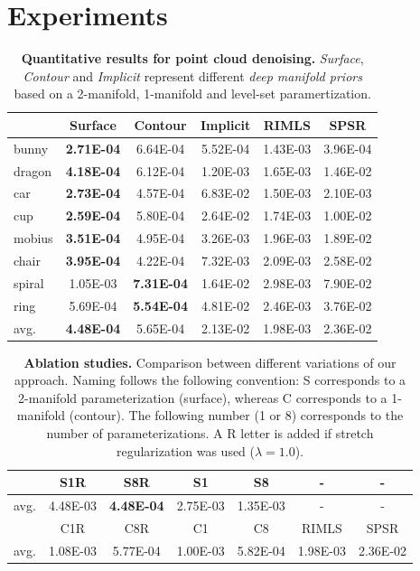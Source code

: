 \section{Experiments}\label{dmp:experiments}

\begin{table}[t]
\centering
\footnotesize
\tabcolsep=0.11cm
\begin{tabular}{|l|c|c|c||c|c|}
\hline
& Surface & Contour & Implicit & RIMLS\cite{rimls} & SPSR\cite{spsr} \\
\hline
bunny & \textbf{2.71E-04} & 6.64E-04 & 5.52E-04 & 1.43E-03 & 3.96E-04 \\
dragon & \textbf{4.18E-04} & 6.12E-04 & 1.20E-03 & 1.65E-03 & 1.46E-02 \\
car & \textbf{2.73E-04} & 4.57E-04 & 6.83E-02 & 1.50E-03 & 2.10E-03 \\
cup &  \textbf{2.59E-04} & 5.80E-04 & 2.64E-02 & 1.74E-03 & 1.00E-02 \\
mobius &  \textbf{3.51E-04} & 4.95E-04 & 3.26E-03 & 1.96E-03 & 1.89E-02 \\
chair &  \textbf{3.95E-04} & 4.22E-04 & 7.32E-03 & 2.09E-03 & 2.58E-02 \\
spiral &  1.05E-03 & \textbf{7.31E-04} & 1.64E-02 & 2.98E-03 & 7.90E-02 \\
ring &  5.69E-04 & \textbf{5.54E-04}& 4.81E-02 & 2.46E-03 & 3.76E-02 \\
\hline
avg. & \textbf{4.48E-04} & 5.65E-04& 2.13E-02 & 1.98E-03 & 2.36E-02 \\
\hline
\end{tabular}
\vspace{4pt}
\caption{ \small \label{tab:denoising} \textbf{Quantitative results for point cloud denoising.}
\emph{Surface}, \emph{Contour} and \emph{Implicit} represent different \emph{deep manifold priors} based on a 2-manifold, 1-manifold and level-set paramertization.
}
\vspace{-15pt}
\end{table}
\begin{table}[t]
\centering
\scriptsize
\tabcolsep=0.11cm
\begin{tabular}{|l|c|c|c|c||c|c|}
\hline
& S1R & S8R & S1 & S8 & - & - \\
\hline
avg. & 4.48E-03 & \textbf{4.48E-04} & 2.75E-03 & 1.35E-03  & - & - \\
\hline \hline
& C1R & C8R & C1 & C8 & RIMLS\cite{rimls} & SPSR\cite{spsr} \\
\hline
avg. & 1.08E-03 & 5.77E-04 & 1.00E-03 & 5.82E-04 & 1.98E-03 & 2.36E-02 \\
\hline
\end{tabular}
\vspace{4pt}
\caption{ \small \label{tab:ablation} \textbf{Ablation studies.}
Comparison between different variations of our approach.
Naming follows the following convention: S corresponds to a 2-manifold parameterization (surface), whereas C corresponds to a 1-manifold (contour).
The following number (1 or 8) corresponds to the number of parameterizations.
A R letter is added if stretch regularization was used ($\lambda=1.0$).
}
\end{table}

